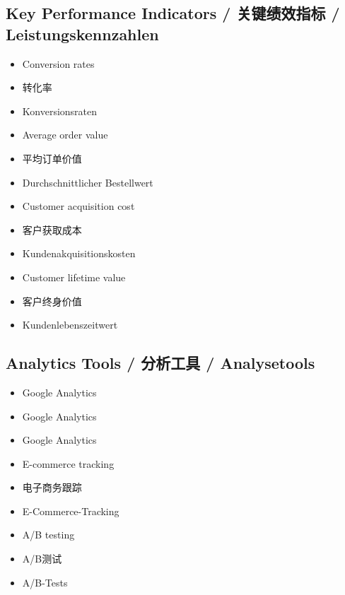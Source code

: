 \subsection{Key Performance Indicators / 关键绩效指标 / Leistungskennzahlen}
\begin{itemize}
    \item Conversion rates
    \item 转化率
    \item Konversionsraten
    \item Average order value
    \item 平均订单价值
    \item Durchschnittlicher Bestellwert
    \item Customer acquisition cost
    \item 客户获取成本
    \item Kundenakquisitionskosten
    \item Customer lifetime value
    \item 客户终身价值
    \item Kundenlebenszeitwert
\end{itemize}

\subsection{Analytics Tools / 分析工具 / Analysetools}
\begin{itemize}
    \item Google Analytics
    \item Google Analytics
    \item Google Analytics
    \item E-commerce tracking
    \item 电子商务跟踪
    \item E-Commerce-Tracking
    \item A/B testing
    \item A/B测试
    \item A/B-Tests
\end{itemize}
